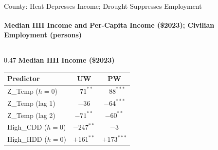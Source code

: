 \documentclass[aspectratio=169,11pt]{beamer}
\newcommand{\emphcolor}[1]{{\color{WarmOrange}\textbf{#1}}}
\newcommand{\tealtext}[1]{{\color{Teal}#1}}
\begin{document}
\begin{frame}{County: Heat Depresses Income; Drought Suppresses Employment}
  \framesubtitle{Median HH Income and Per-Capita Income (\$2023); Civilian Employment (persons)}
  \small
  \begin{columns}[T]
    \begin{column}{0.47\textwidth}
      \tealtext{\textbf{Median HH Income (\$2023)}}\\[0.25em]
      \begin{tabular}{lcc}
        \toprule
        Predictor & UW & PW \\
        \midrule
        Z\_Temp ($h{=}0$)   & \emphcolor{$-71^{**}$}  & \emphcolor{$-88^{***}$} \\
        Z\_Temp (lag 1)     & $-36$  & \emphcolor{$-64^{***}$} \\
        Z\_Temp (lag 2)     & \emphcolor{$-71^{**}$}  & \emphcolor{$-60^{**}$}  \\
        High\_CDD ($h{=}0$) & \emphcolor{$-247^{**}$} & $-3$   \\
        High\_HDD ($h{=}0$) & $+161^{**}$ & \emphcolor{$+173^{***}$} \\
        \bottomrule
      \end{tabular}
      \vspace{0.4em}


\end{column}
\end{columns}
\end{frame}
\end{document}
